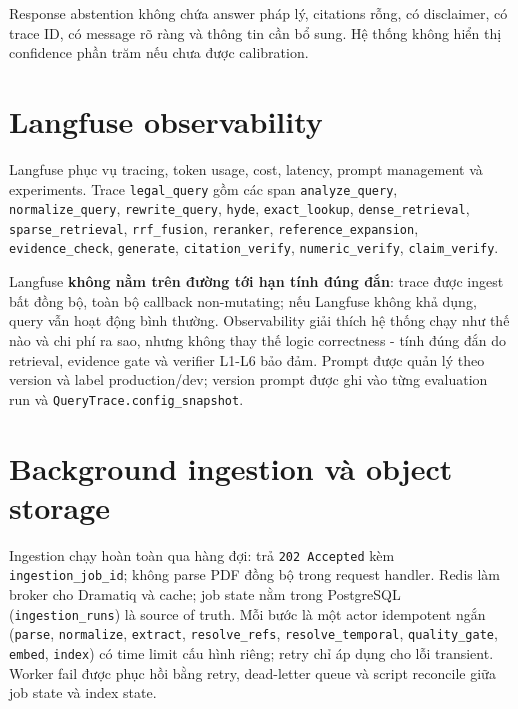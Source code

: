 \documentclass[a4paper,12pt]{extreport}
\newcommand{\code}[1]{\texttt{#1}}
\newcommand{\apipath}[1]{\path{#1}}
\begin{document}
Response abstention không chứa answer pháp lý, citations rỗng, có disclaimer, có trace ID, có message rõ ràng và thông tin cần bổ sung. Hệ thống không hiển thị confidence phần trăm nếu chưa được calibration.

\section{Langfuse observability}

\begin{sloppypar}
Langfuse phục vụ tracing, token usage, cost, latency, prompt management và experiments. Trace \code{legal\_query} gồm các span \code{analyze\_query}, \code{normalize\_query}, \code{rewrite\_query}, \code{hyde}, \code{exact\_lookup}, \code{dense\_retrieval}, \code{sparse\_retrieval}, \code{rrf\_fusion}, \code{reranker}, \code{reference\_expansion}, \code{evidence\_check}, \code{generate}, \code{citation\_verify}, \code{numeric\_verify}, \code{claim\_verify}.
\end{sloppypar}

Langfuse \textbf{không nằm trên đường tới hạn tính đúng đắn}: trace được ingest bất đồng bộ, toàn bộ callback non-mutating; nếu Langfuse không khả dụng, query vẫn hoạt động bình thường. Observability giải thích hệ thống chạy như thế nào và chi phí ra sao, nhưng không thay thế logic correctness - tính đúng đắn do retrieval, evidence gate và verifier L1-L6 bảo đảm. Prompt được quản lý theo version và label production/dev; version prompt được ghi vào từng evaluation run và \code{QueryTrace.config\_snapshot}.

\section{Background ingestion và object storage}

\begin{sloppypar}
Ingestion chạy hoàn toàn qua hàng đợi: \apipath{POST /api/v1/documents} trả \code{202 Accepted} kèm \code{ingestion\_job\_id}; không parse PDF đồng bộ trong request handler. Redis làm broker cho Dramatiq và cache; job state nằm trong PostgreSQL (\code{ingestion\_runs}) là source of truth. Mỗi bước là một actor idempotent ngắn (\code{parse}, \code{normalize}, \code{extract}, \code{resolve\_refs}, \code{resolve\_temporal}, \code{quality\_gate}, \code{embed}, \code{index}) có time limit cấu hình riêng; retry chỉ áp dụng cho lỗi transient. Worker fail được phục hồi bằng retry, dead-letter queue và script reconcile giữa job state và index state.
\end{sloppypar}
\end{document}
